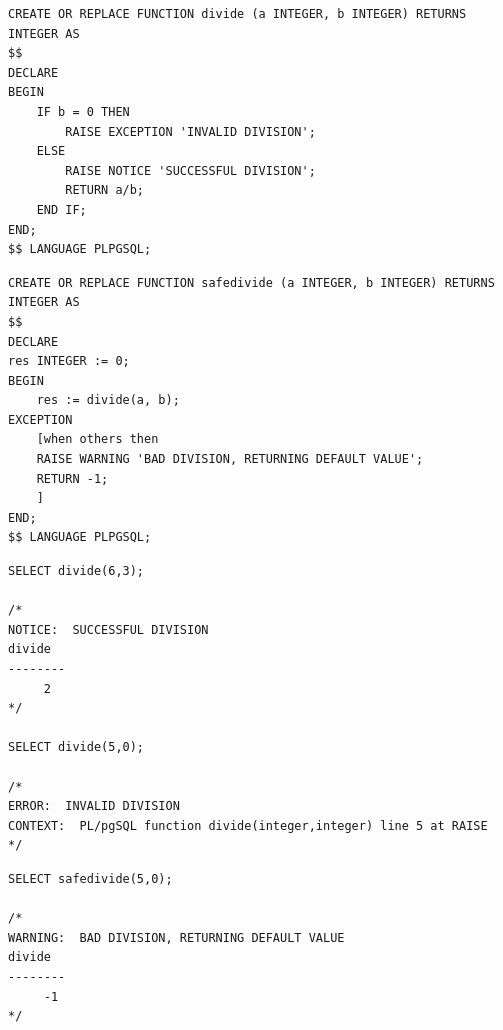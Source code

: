 \documentclass[12pt]{cmuthesis}
\begin{document}
\begin{listing}
\begin{verbatim}
CREATE OR REPLACE FUNCTION divide (a INTEGER, b INTEGER) RETURNS INTEGER AS 
$$
DECLARE
BEGIN
    IF b = 0 THEN
        RAISE EXCEPTION 'INVALID DIVISION';
    ELSE
        RAISE NOTICE 'SUCCESSFUL DIVISION';
        RETURN a/b;
    END IF;
END;
$$ LANGUAGE PLPGSQL;
\end{verbatim}
\caption{An example of \texttt{RAISE} statement usage using a function that divides its two inputs. It raises an exception if the given denominator is zero.}
\label{list:raiseexample}
\end{listing}

\begin{listing}
\begin{verbatim}
CREATE OR REPLACE FUNCTION safedivide (a INTEGER, b INTEGER) RETURNS INTEGER AS 
$$
DECLARE
res INTEGER := 0;
BEGIN
    res := divide(a, b);
EXCEPTION
    [when others then 
    RAISE WARNING 'BAD DIVISION, RETURNING DEFAULT VALUE';
    RETURN -1;
    ]
END;
$$ LANGUAGE PLPGSQL;
\end{verbatim}
\caption{An example of \texttt{RAISE} statement and \texttt{EXCEPTION} block usage using a function that wraps a call to \texttt{divide} from \cref{list:raiseexample} with an \texttt{EXCEPTION} block to catch any divisions by zero.}
\label{list:safedivide}
\end{listing}

\begin{listing}
\begin{verbatim}
SELECT divide(6,3);

/* 
NOTICE:  SUCCESSFUL DIVISION
divide 
--------
     2
*/

SELECT divide(5,0);

/*
ERROR:  INVALID DIVISION
CONTEXT:  PL/pgSQL function divide(integer,integer) line 5 at RAISE
*/
\end{verbatim}
\caption{Example invocation and output of \texttt{divide} from \cref{list:raiseexample}}
\label{list:raiseexamploutput}
\end{listing}

\begin{listing}
\begin{verbatim}
SELECT safedivide(5,0);

/*
WARNING:  BAD DIVISION, RETURNING DEFAULT VALUE
divide 
--------
     -1
*/

\end{verbatim}
\caption{Example invocation and output of \texttt{safedivide} from \cref{list:safedivide}}
\label{list:safedivideoutput}
\end{listing}
\end{document}
